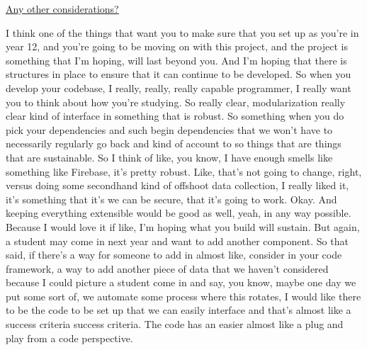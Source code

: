 \documentclass[titlepage]{article}
\begin{document}
\begin{center}
  \vspace*{3mm}
  \underline{Any other considerations?}
  \vspace*{1mm}
\end{center}

I think one of the things that want you to make sure that you set up as you're in year 12, and you're going to be moving on with this project, and the project is something that I'm hoping, will last beyond you. And I'm hoping that there is structures in place to ensure that it can continue to be developed. So when you develop your codebase, I really, really, really capable programmer, I really want you to think about how you're studying. So really clear, modularization really clear kind of interface in something that is robust. So something when you do pick your dependencies and such begin dependencies that we won't have to necessarily regularly go back and kind of account to so things that are things that are sustainable. So I think of like, you know, I have enough smells like something like Firebase, it's pretty robust. Like, that's not going to change, right, versus doing some secondhand kind of offshoot data collection, I really liked it, it's something that it's we can be secure, that it's going to work. Okay. And keeping everything extensible would be good as well, yeah, in any way possible. Because I would love it if like, I'm hoping what you build will sustain. But again, a student may come in next year and want to add another component. So that said, if there's a way for someone to add in almost like, consider in your code framework, a way to add another piece of data that we haven't considered because I could picture a student come in and say, you know, maybe one day we put some sort of, we automate some process where this rotates, I would like there to be the code to be set up that we can easily interface and that's almost like a success criteria success criteria. The code has an easier almost like a plug and play from a code perspective.
\end{document}
